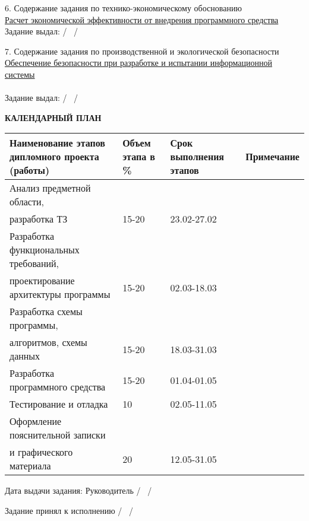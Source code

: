 {  \small{6. Содержание задания по технико-экономическому обоснованию} \\
  \uline{\small{Расчет экономической эффективности от внедрения программного средства}}\lineunderscore\\

  \small{Задание выдал: \uline{\hspace*{6em}} / \diplomaTaskEconConsultant~/}
  \vspace{1em}

  \small{7. Содержание задания по производственной и экологической безопасности} \\
  \uline{\small{Обеспечение безопасности при разработке и испытании информационной системы}}\lineunderscore\\
  \lineunderscore\\

  \small{Задание выдал:  \uline{\hspace*{6em}} / \diplomaTaskLaborProtectionConsultant~/}

  \begin{center}
    \textbf{\small{КАЛЕНДАРНЫЙ ПЛАН}}
  \end{center}

  \begin{tabular}{| >{}m{} 
                  | >{\centering}m{}
                  | >{\centering}m{}  
                  | >{\centering\arraybackslash}m{}|}
    \hline \small{Наименование этапов дипломного проекта (работы)} & \small{Объем этапа в \%} & \small{Срок выполнения этапов} & \small{Примечание} \\
    \hline \small{Анализ предметной области,} & & & \\
    \hline \small{разработка ТЗ} & \small{15-20} & \small{23.02-27.02} & \\
    \hline \small{Разработка функциональных требований,} & & & \\
    \hline \small{проектирование архитектуры программы } & \small{15-20} & \small{02.03-18.03} & \\
    \hline \small{Разработка схемы программы},& & & \\
    \hline \small{алгоритмов, схемы данных} & \small{15-20} & \small{18.03-31.03} & \\
    \hline \small{Разработка программного средства} & \small{15-20} & \small{01.04-01.05} & \\
    \hline \small{Тестирование и отладка} & \small{10} & \small{02.05-11.05} & \\
    \hline \small{Оформление пояснительной записки} & & & \\
    \hline \small{и графического материала} & \small{20} & \small{12.05-31.05} & \\
    \hline
  \end{tabular}

  \vspace{2em}

  \small{Дата выдачи задания: \uline{\hspace*{9em}} \hspace{2ex} Руководитель \hfill{} \uline{\hspace*{6em}} / \diplomaTaskSupervisor~/}

  \vspace{1em}

  \small{Задание принял к исполнению \uline{\hspace*{7em}} / \diplomaTaskMe~/}

  \restoregeometry
}
